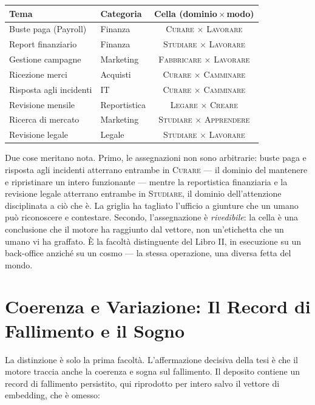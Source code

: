 \begin{center}
\begin{tabular}{@{}llc@{}}
\toprule
Tema & Categoria & Cella (dominio\,$\times$\,modo) \\
\midrule
Buste paga (Payroll)          & Finanza       & \textsc{Curare} $\times$ \textsc{Lavorare} \\
Report finanziario            & Finanza       & \textsc{Studiare} $\times$ \textsc{Lavorare} \\
Gestione campagne             & Marketing     & \textsc{Fabbricare} $\times$ \textsc{Lavorare} \\
Ricezione merci               & Acquisti      & \textsc{Curare} $\times$ \textsc{Camminare} \\
Risposta agli incidenti       & IT            & \textsc{Curare} $\times$ \textsc{Camminare} \\
Revisione mensile             & Reportistica  & \textsc{Legare} $\times$ \textsc{Creare} \\
Ricerca di mercato            & Marketing     & \textsc{Studiare} $\times$ \textsc{Apprendere} \\
Revisione legale              & Legale        & \textsc{Studiare} $\times$ \textsc{Lavorare} \\
\bottomrule
\end{tabular}
\end{center}

Due cose meritano nota. Primo, le assegnazioni non sono arbitrarie: buste paga e
risposta agli incidenti atterrano entrambe in \textsc{Curare} --- il dominio del
mantenere e ripristinare un intero funzionante --- mentre la reportistica
finanziaria e la revisione legale atterrano entrambe in \textsc{Studiare}, il
dominio dell'attenzione disciplinata a ci\`o che \`e. La griglia ha tagliato
l'ufficio a giunture che un umano pu\`o riconoscere e contestare. Secondo,
l'assegnazione \`e \emph{rivedibile}: la cella \`e una conclusione che il motore
ha raggiunto dal vettore, non un'etichetta che un umano vi ha graffato. \`E la
facolt\`a distinguente del Libro II, in esecuzione su un back-office anzich\'e su
un cosmo --- la stessa operazione, una diversa fetta del mondo.

\section{Coerenza e Variazione: Il Record di Fallimento e il Sogno}

La distinzione \`e solo la prima facolt\`a. L'affermazione decisiva della tesi \`e
che il motore traccia anche la coerenza e sogna sul fallimento. Il deposito
contiene un record di fallimento persistito, qui riprodotto per intero salvo
il vettore di embedding, che \`e omesso:

